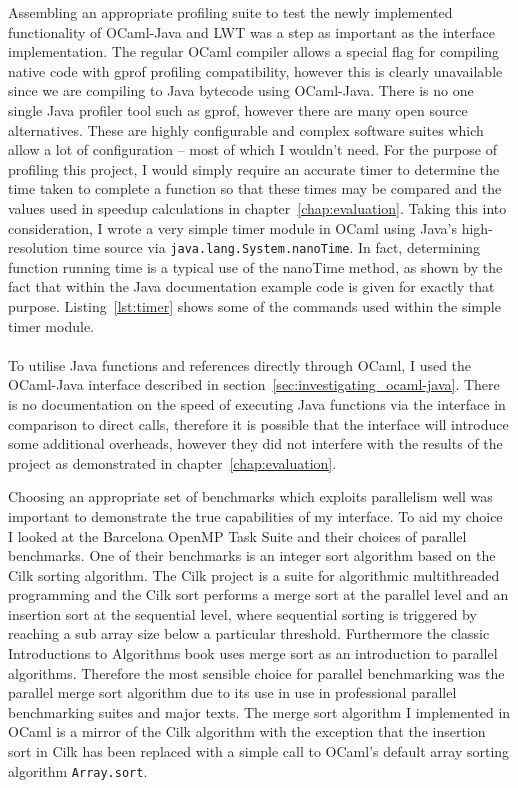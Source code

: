 \documentclass[12pt,twoside,notitlepage]{report}
\begin{document}
Assembling an appropriate profiling suite to test the newly implemented functionality of OCaml-Java and LWT was a step as important as the interface implementation. The regular OCaml compiler allows a special flag for compiling native code with gprof
profiling compatibility\cite{leroy2013}, however this is clearly unavailable since we are compiling to Java bytecode using OCaml-Java. There is no one single Java profiler tool such as gprof, however there are many open source
alternatives. These are highly configurable and complex software suites which allow a lot of configuration -- most of which I wouldn't need. For the purpose of profiling this project, I would simply require an accurate timer to
determine the time taken to complete a function so that these times may be compared and the values used in speedup calculations in chapter~\ref{chap:evaluation}. Taking this into consideration, I wrote a very simple timer module in
OCaml using Java's high-resolution time source via {\tt java.lang.System.nanoTime}. In fact, determining function running time is a typical use of the nanoTime method, as shown by the fact that within the Java documentation example
code is given for exactly that purpose. Listing~\ref{lst:timer} shows some of the commands used within the simple timer module.
\hfill\\

\hfill\\
To utilise Java functions and references directly through OCaml, I used the OCaml-Java interface described in section~\ref{sec:investigating_ocaml-java}. There is no documentation on the speed of executing Java functions via the interface in
comparison to direct calls, therefore it is possible that the interface will introduce some additional overheads, however they did not interfere with the results of the project as demonstrated in chapter~\ref{chap:evaluation}.

%
%
Choosing an appropriate set of benchmarks which exploits parallelism well was important to demonstrate the true capabilities of my interface. To aid my choice I looked at the Barcelona OpenMP Task Suite and their choices of parallel
benchmarks. One of their benchmarks is an integer sort algorithm based on the Cilk sorting algorithm. The Cilk project is a suite for algorithmic multithreaded programming and the Cilk sort performs a merge sort at the parallel level
and an insertion sort at the sequential level, where sequential sorting is triggered by reaching a sub array size below a particular threshold. Furthermore the classic Introductions to Algorithms book \cite{cormen2009} uses merge sort
as an introduction to parallel algorithms. Therefore the most sensible choice for parallel benchmarking was the parallel merge sort algorithm due to its use in use in professional parallel benchmarking suites and major texts. The merge sort algorithm
I implemented in OCaml is a mirror of the Cilk algorithm with the exception that the insertion sort in Cilk has been replaced with a simple call to OCaml's default array sorting algorithm {\tt Array.sort}.
\end{document}
